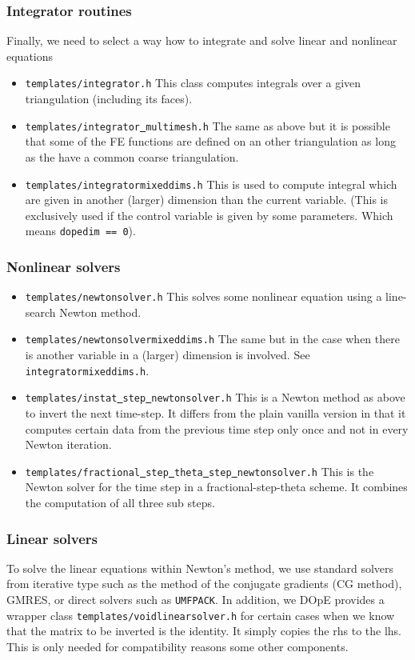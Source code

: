 \documentclass[prodmode,acmtoms]{acmsmall}
\numberwithin{equation}{section}
\begin{document}
\subsubsection{Integrator routines}
Finally, we need to select a way how to integrate and solve linear and nonlinear equations
\begin{itemize}
\item \texttt{templates/integrator.h} This class computes integrals over a given 
  triangulation (including its faces).
\item \texttt{templates/integrator\underline{ }multimesh.h} The same as above but it is 
  possible that some of the FE functions are defined on an other triangulation 
  as long as the have a common coarse triangulation.
\item \texttt{templates/integratormixeddims.h} This is used to compute integral which 
  are given in another (larger) dimension than the current variable. (This is exclusively
  used if the control variable is given by some parameters. Which means \texttt{dopedim == 0}). 
\end{itemize}

\subsubsection{Nonlinear solvers}
\begin{itemize}
\item \texttt{templates/newtonsolver.h} This solves some nonlinear equation using a 
  line-search Newton method.
\item \texttt{templates/newtonsolvermixeddims.h} The same but in the case when there is 
  another variable in a (larger) dimension is involved. See 
  \texttt{integratormixeddims.h}.
\item \texttt{templates/instat\underline{ }step\underline{ }newtonsolver.h} This is a 
  Newton method as above to invert the next time-step. It differs from the plain vanilla
  version in that it computes certain data from the previous time step only once 
  and not in every Newton iteration.
\item \texttt{templates/fractional\underline{ }step\underline{ }theta\underline{ }step\underline{ }newtonsolver.h} This is the Newton solver for the time step in a 
  fractional-step-theta scheme. It combines the computation of all three sub steps.
\end{itemize}

\subsubsection{Linear solvers}
To solve the linear equations within Newton's method, we use 
standard solvers from iterative type 
such as the method of the conjugate gradients (CG method), 
GMRES, or direct solvers such as \texttt{UMFPACK}.
In addition, we DOpE provides  a wrapper class 
\texttt{templates/voidlinearsolver.h} for certain cases when we 
  know that the matrix to be inverted is the identity. It simply copies the rhs to the
  lhs. This is only needed for compatibility reasons some other components.
\end{document}

